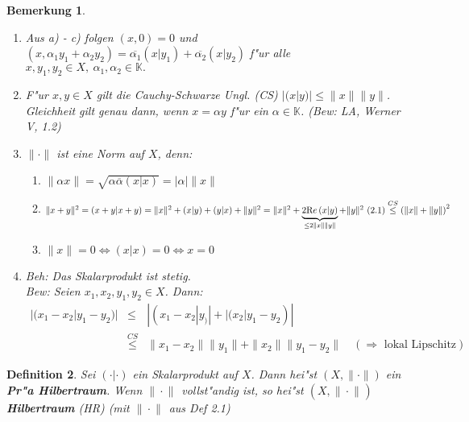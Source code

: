 \documentclass[a4paper,11pt]{book}
\newcommand{\K}{{\mathbb K}}
\newcommand{\begriff}[1]{\textbf{#1}} %
\newcommand{\re}{\ensuremath{\text Re}\,} %
\newcommand{\LN}[1][]{\| \cdot \|_{#1}} %
\newtheorem{Def}{Definition}[chapter]
\newtheorem{Bem}[Def]{Bemerkung}
\theoremstyle{nonumberplain}
\begin{document}
\begin{Bem}
\begin{enumerate}

\item Aus a) - c) folgen $(x,0) = 0$ und $(x,\alpha_1 y_1 + \alpha_2 y_2) = \overline{\alpha_1}(x|y_1) + \overline{\alpha_2}(x|y_2)$ f"ur alle $x,y_1,y_2 \in X,\ \alpha_1,\alpha_2 \in \K.$

\item F"ur $x,y \in X$ gilt die Cauchy-Schwarze Ungl. (CS) $|(x|y)| \leq \|x\| \|y\|$. Gleichheit gilt genau dann, wenn $x = \alpha y$ f"ur ein $\alpha \in \K$. (Bew: LA, Werner V, 1.2)

\item $\| \cdot \|$ ist eine Norm auf $X$, denn:
\begin{enumerate}
\item[(i)] $\| \alpha x \| = \sqrt{\alpha \overline{\alpha} (x|x)} = |\alpha| \|x\|$

\item[(ii)] $\| x+y \|^2 = (x+y|x+y) = \|x\|^2 + (x|y) + (y|x) + \|y\|^2 = \|x\|^2 + \underbrace{2 \re (x|y)}_{\leq 2\|x\| \|y\|}+ \|y\|^2 \ (2.1) \stackrel{CS}{\leq} \left( \|x\|+\|y\|\right)^2$

\item[(iii)] $\|x\| = 0 \Leftrightarrow (x|x) = 0 \Leftrightarrow x = 0$
\end{enumerate}

\item \emph{Beh:} Das Skalarprodukt ist stetig.\\
\emph{Bew:} Seien $x_1,x_2,y_1,y_2 \in X$. Dann:
\begin{eqnarray}
|(x_1-x_2|y_1-y_2)| & \leq & |(x_1-x_2|y_)| + |(x_2|y_1-y_2)| \\
& \stackrel{CS}{\leq} & \|x_1 - x_2\| \|y_1\| + \|x_2\| \|y_1-y_2\| \quad (\Rightarrow \text{ lokal Lipschitz})
\end{eqnarray}

\end{enumerate}
\end{Bem}

\begin{Def}
Sei $(\cdot|\cdot)$ ein Skalarprodukt auf $X$. Dann hei"st $(X, \| \cdot \|)$ ein \begriff{Pr"a Hilbertraum}. Wenn $\LN$ vollst"andig ist, so hei"st $(X,\LN)$ \begriff{Hilbertraum} (HR) (mit $\LN$ aus Def 2.1)
\end{Def}
\end{document}
